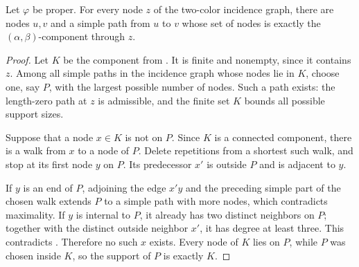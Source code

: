 \begin{lemma}
Let $\varphi$ be proper.  For every node $z$ of the two-color incidence
graph, there are nodes $u,v$ and a simple path from $u$ to $v$ whose set of
nodes is exactly the $(\alpha,\beta)$-component through $z$.
\end{lemma}
\begin{proof}
Let $K$ be the component from .  It is finite
and nonempty, since it contains $z$.  Among all simple paths in the
incidence graph whose nodes lie in $K$, choose one, say $P$, with the
largest possible number of nodes.  Such a path exists: the length-zero path
at $z$ is admissible, and the finite set $K$ bounds all possible support
sizes.

Suppose that a node $x\in K$ is not on $P$.  Since $K$ is a connected
component, there is a walk from $x$ to a node of $P$.  Delete repetitions
from a shortest such walk, and stop at its first node $y$ on $P$.  Its
predecessor $x'$ is outside $P$ and is adjacent to $y$.

If $y$ is an end of $P$, adjoining the edge $x'y$ and the preceding simple
part of the chosen walk extends $P$ to a simple path with more nodes, which
contradicts maximality.  If $y$ is internal to $P$, it already has two
distinct neighbors on $P$; together with the distinct outside neighbor
$x'$, it has degree at least three.  This contradicts
.  Therefore no such $x$ exists.
Every node of $K$ lies on $P$, while $P$ was chosen inside $K$, so the
support of $P$ is exactly $K$.
\end{proof}
